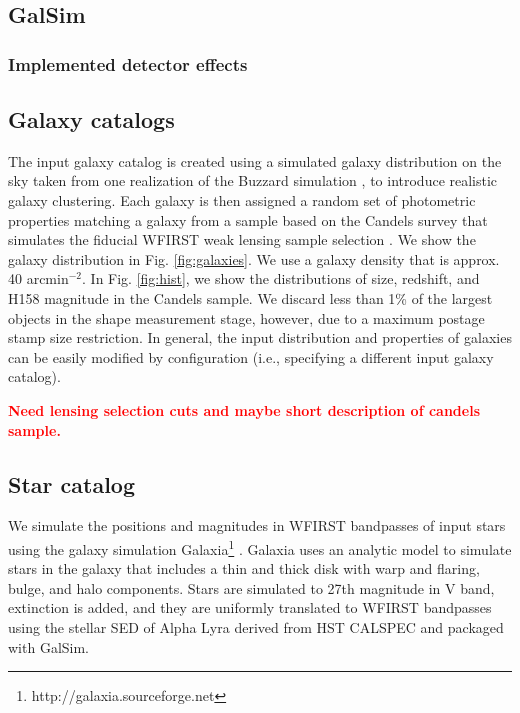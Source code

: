 \documentclass[aps,prd, amsmath,amssymb,superscriptaddress,showkeys,nofootinbib,reprint,preprintnumbers]{revtex4-1}
\newcommand{\verify}[1]{\textcolor{red}{\textbf{{#1}}}}
\begin{document}
\subsection{GalSim}



\subsubsection{Implemented detector effects}\label{effects}


\subsection{Galaxy catalogs}\label{galcats}

The input galaxy catalog is created using a simulated galaxy distribution on the sky taken from one realization of the Buzzard simulation \cite{2019arXiv190102401D,wechsler2019}, to introduce realistic galaxy clustering. 
Each galaxy is then assigned a random set of photometric properties matching a galaxy from a sample based on the Candels survey that simulates the fiducial WFIRST weak lensing sample selection \cite{2019ApJ...877..117H}. 
We show the galaxy distribution in Fig. \ref{fig:galaxies}. 
We use a galaxy density that is approx. 40 arcmin$^{-2}$. 
In Fig. \ref{fig:hist}, we show the distributions of size, redshift, and H158 magnitude in the Candels sample. 
We discard less than 1\% of the largest objects in the shape measurement stage, however, due to a maximum postage stamp size restriction. 
In general, the input distribution and properties of galaxies can be easily modified by configuration (i.e., specifying a different input galaxy catalog).

\verify{Need lensing selection cuts and maybe short description of candels sample.}

\subsection{Star catalog}\label{starcat}

We simulate the positions and magnitudes in WFIRST bandpasses of input stars using the galaxy simulation Galaxia\footnote{http://galaxia.sourceforge.net} \cite{galaxia}. 
Galaxia uses an analytic model \cite{galaxia2}  to simulate stars in the galaxy that includes a thin and thick disk with warp and flaring, bulge, and halo components. 
Stars are simulated to 27th magnitude in V band, extinction is added, and they are uniformly translated to WFIRST bandpasses using the stellar SED of Alpha Lyra derived from HST CALSPEC and packaged with GalSim. 
\end{document}
